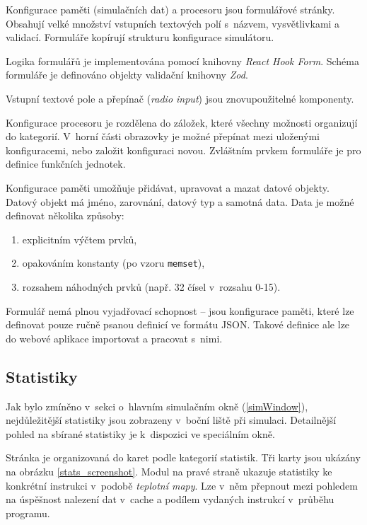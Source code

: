 Konfigurace paměti (simulačních dat) a procesoru jsou formulářové stránky.
Obsahují velké množství vstupních textových polí s~názvem, vysvětlivkami a validací.
Formuláře kopírují strukturu konfigurace simulátoru.

Logika formulářů je implementována pomocí knihovny \emph{React Hook Form}.
Schéma formuláře je definováno objekty validační knihovny \emph{Zod}.

Vstupní textové pole a přepínač (\emph{radio input}) jsou znovupoužitelné komponenty.

Konfigurace procesoru je rozdělena do záložek, které všechny možnosti organizují do kategorií.
V~horní části obrazovky je možné přepínat mezi uloženými konfiguracemi, nebo založit konfiguraci novou.
Zvláštním prvkem formuláře je  pro definice funkčních jednotek.

Konfigurace paměti umožňuje přidávat, upravovat a mazat datové objekty.
Datový objekt má jméno, zarovnání, datový typ a samotná data.
Data je možné definovat několika způsoby:
\begin{enumerate}
    \item explicitním výčtem prvků,
    \item opakováním konstanty (po vzoru \texttt{memset}),
    \item rozsahem náhodných prvků (např. 32 čísel v~rozsahu 0-15).
\end{enumerate}
Formulář nemá plnou vyjadřovací schopnost -- jsou konfigurace paměti, které lze definovat pouze ručně psanou definicí ve formátu JSON.
Takové definice ale lze do webové aplikace importovat a pracovat s~nimi.

\subsection{Statistiky}
\label{statsPage}

Jak bylo zmíněno v~sekci o~hlavním simulačním okně (\ref{simWindow}), nejdůležitější statistiky jsou zobrazeny v~boční liště při simulaci.
Detailnější pohled na sbírané statistiky je k~dispozici ve speciálním okně.

Stránka je organizovaná do karet podle kategorií statistik.
Tři karty jsou ukázány na obrázku \ref{stats_screenshot}.
Modul na pravé straně ukazuje statistiky ke konkrétní instrukci v~podobě \emph{teplotní mapy}.
Lze v~něm přepnout mezi pohledem na úspěšnost nalezení dat v~cache a podílem vydaných instrukcí v~průběhu programu.

